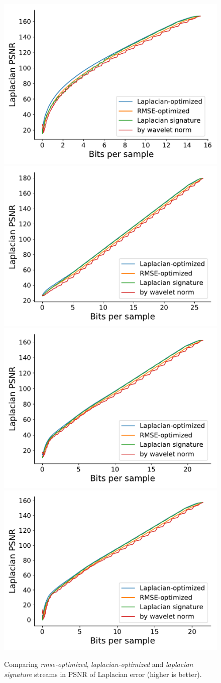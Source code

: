 \begin{figure}
	\centering
	{\includegraphics[width=0.48\linewidth]{img/gradient-laplacian/euler2d-laplacian.pdf}}
	{\includegraphics[width=0.48\linewidth]{img/gradient-laplacian/magnetic-laplacian.pdf}}
	{\includegraphics[width=0.48\linewidth]{img/gradient-laplacian/miranda-diffusivity-laplacian.pdf}}
	{\includegraphics[width=0.48\linewidth]{img/gradient-laplacian/miranda-velocityz-laplacian.pdf}}
	\caption{Comparing \emph{rmse-optimized}, \emph{laplacian-optimized} and \emph{laplacian
	signature} streams in PSNR of Laplacian error (higher is better).}
	\label{fig:laplacian-comparison}
\end{figure}

